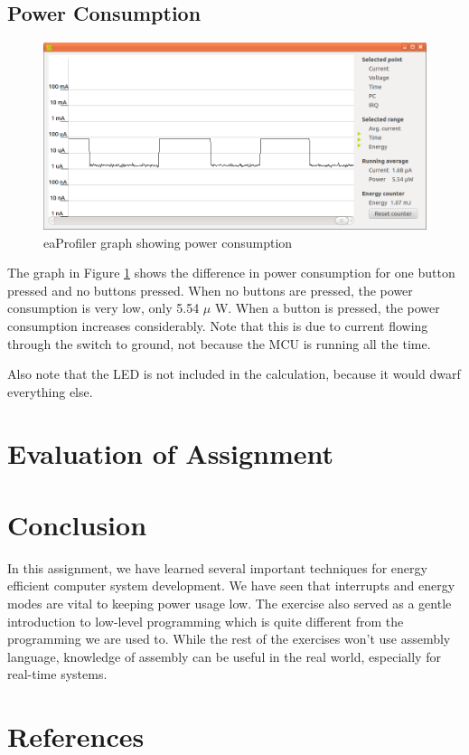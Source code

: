 \documentclass[a4paper, 12pt]{article}
\begin{document}
	\subsection{Power Consumption} %
	\label{sub:power_consumption}
		\begin{figure}[!ht]
        \includegraphics[width=\textwidth]{eaprofiler}
        \caption{eaProfiler graph showing power consumption}
        \label{fig:profiler}
        \end{figure}
        The graph in Figure \ref{fig:profiler} shows the difference in power consumption for one button pressed and no buttons pressed. When no buttons are pressed, the power consumption is very low, only 5.54 $\mu$ W. When a button is pressed, the power consumption increases considerably. Note that this is due to current flowing through the switch to ground, not because the MCU is running all the time.

        Also note that the LED is not included in the calculation, because it would dwarf everything else.

\section{Evaluation of Assignment} %
\label{sec:evaluation_of_assignment}


\section{Conclusion} %
\label{sec:conclusion}
    In this assignment, we have learned several important techniques for energy efficient computer system development. We have seen that interrupts and energy modes are vital to keeping power usage low. The exercise also served as a gentle introduction to low-level programming which is quite different from the programming we are used to. While the rest of the exercises won't use assembly language, knowledge of assembly can be useful in the real world, especially for real-time systems.

\section{References} %
\label{sec:references}
    
\end{document}
